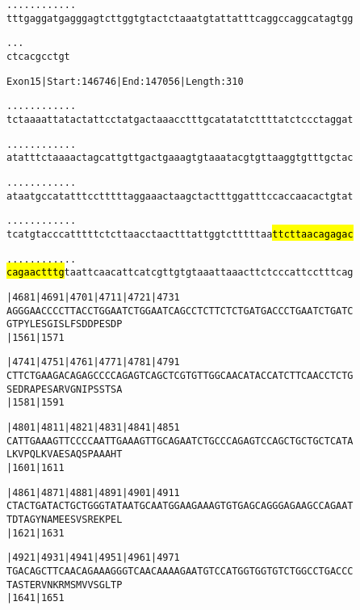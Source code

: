 \documentclass{article}
\begin{document}
\newpage
\begin{alltt}
.    .    .    .    .    .    .    .    .    .    .    .    
tttgaggatgagggagtcttggtgtactctaaatgtattatttcaggccaggcatagtgg

.    .    .
ctcacgcctgt
\end{alltt}
\newpage
\begin{alltt}
Exon 15 | Start: 146746 | End: 147056 | Length: 310

.    .    .    .    .    .    .    .    .    .    .    .    
tctaaaattatactattcctatgactaaacctttgcatatatcttttatctccctaggat

.    .    .    .    .    .    .    .    .    .    .    .    
atatttctaaaactagcattgttgactgaaagtgtaaatacgtgttaaggtgtttgctac

.    .    .    .    .    .    .    .    .    .    .    .    
ataatgccatatttcctttttaggaaactaagctactttggatttccaccaacactgtat

.    .    .    .    .    .    .    .    .    .    .    .    
tcatgtacccatttttctcttaacctaactttattggtctttttaa\hl{ttcttaacagagac}

.    .    .    .    .    .    .    .    .    .    .    .    
\hl{cagaactttg}taattcaacattcatcgttgtgtaaattaaacttctcccattcctttcag

     |4681     |4691     |4701     |4711     |4721     |4731
AGGGAACCCCTTACCTGGAATCTGGAATCAGCCTCTTCTCTGATGACCCTGAATCTGATC
  G  T  P  Y  L  E  S  G  I  S  L  F  S  D  D  P  E  S  D  P
     |1561                         |1571                    

     |4741     |4751     |4761     |4771     |4781     |4791
CTTCTGAAGACAGAGCCCCAGAGTCAGCTCGTGTTGGCAACATACCATCTTCAACCTCTG
  S  E  D  R  A  P  E  S  A  R  V  G  N  I  P  S  S  T  S  A
     |1581                         |1591                    

     |4801     |4811     |4821     |4831     |4841     |4851
CATTGAAAGTTCCCCAATTGAAAGTTGCAGAATCTGCCCAGAGTCCAGCTGCTGCTCATA
  L  K  V  P  Q  L  K  V  A  E  S  A  Q  S  P  A  A  A  H  T
     |1601                         |1611                    

     |4861     |4871     |4881     |4891     |4901     |4911
CTACTGATACTGCTGGGTATAATGCAATGGAAGAAAGTGTGAGCAGGGAGAAGCCAGAAT
  T  D  T  A  G  Y  N  A  M  E  E  S  V  S  R  E  K  P  E  L
     |1621                         |1631                    

     |4921     |4931     |4941     |4951     |4961     |4971
TGACAGCTTCAACAGAAAGGGTCAACAAAAGAATGTCCATGGTGGTGTCTGGCCTGACCC
  T  A  S  T  E  R  V  N  K  R  M  S  M  V  V  S  G  L  T  P
     |1641                         |1651                    

\end{alltt}
\end{document}
